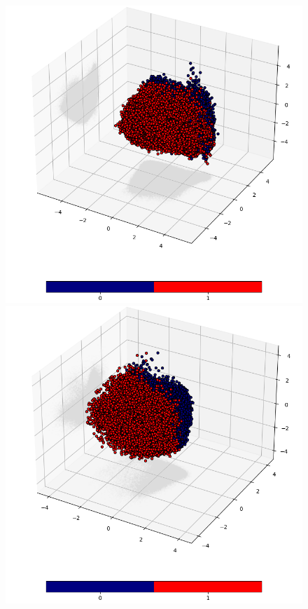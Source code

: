 \documentclass[12pt]{article}
\begin{document}
	\begin{figure}[h!]
		\centering
		\includegraphics[scale=0.4]{003_train_v2_MDE_PCA.png}
		\includegraphics[scale=0.4]{003_validate_v2_MDE_PCA.png}


\end{figure}
\end{document}
